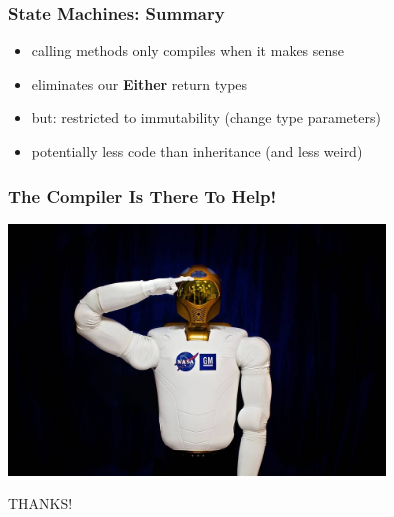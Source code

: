 \documentclass{beamer}
\begin{document}
\begin{frame}
  \frametitle{State Machines: Summary}
  \begin{itemize}
  \item calling methods only compiles when it makes sense
  \item eliminates our \textbf{Either} return types
  \item but: restricted to immutability (change type parameters)
  \item potentially less code than inheritance (and less weird)
  \end{itemize}
\end{frame}

\begin{frame}
  \frametitle{The Compiler Is There To Help!}
  \begin{center}
    \includegraphics[width=0.75\textwidth]{../pics/robot.jpg}
  \end{center}

  \vfill
  \begin{center}
    {\Huge THANKS!}
  \end{center}
\end{frame}
\end{document}
